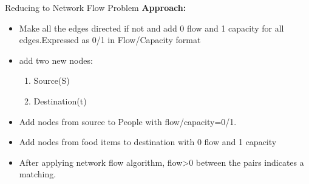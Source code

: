 \documentclass{beamer}
\begin{document}
\begin{frame}{Reducing to Network Flow Problem}
\textbf{Approach: }\\
    \begin{itemize}
        \item Make all the edges directed if not and add 0 flow and 1 capacity for all edges.Expressed as 0/1 in Flow/Capacity format
        \item add two new nodes: 
        \begin{enumerate}
            \item Source(S)
            \item Destination(t)
        \end{enumerate}
        \item 
        Add nodes from source to People with flow/capacity=0/1.
        \item 
        Add nodes from food items to destination with 0 flow and 1 capacity
        \item After applying network flow algorithm, flow>0 between the pairs indicates a matching.
        
    \end{itemize}
    
\end{frame}
\end{document}
